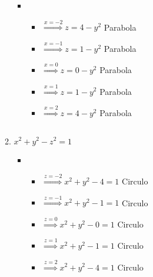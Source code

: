 \documentclass[../practica_02.tex]{subfiles}
\begin{document}
\begin{enumerate}
\begin{enumerate}
\begin{itemize}
                            $ $

                        \item
                            \begin{itemize}
                                \item $\stackrel{x=-2}{\Rightarrow} z = 4 - y^2 $ Parabola
                                \item $\stackrel{x=-1}{\Rightarrow} z = 1 - y^2 $ Parabola
                                \item $\stackrel{x=0}{\Rightarrow}  z = 0 - y^2 $ Parabola
                                \item $\stackrel{x=1}{\Rightarrow}  z = 1 - y^2 $ Parabola
                                \item $\stackrel{x=2}{\Rightarrow}  z = 4 - y^2 $ Parabola
                            \end{itemize}

                            $ $
                    \end{itemize}

                \item $x^2 + y^2 - z^2 = 1$

                    \begin{itemize}
                        \item
                            \begin{itemize}
                                \item $\stackrel{z=-2}{\Rightarrow} x^2 + y^2 - 4 = 1 $ Circulo
                                \item $\stackrel{z=-1}{\Rightarrow} x^2 + y^2 - 1 = 1 $ Circulo
                                \item $\stackrel{z=0}{\Rightarrow}  x^2 + y^2 - 0 = 1 $ Circulo
                                \item $\stackrel{z=1}{\Rightarrow}  x^2 + y^2 - 1 = 1 $ Circulo
                                \item $\stackrel{z=2}{\Rightarrow}  x^2 + y^2 - 4 = 1 $ Circulo
                            \end{itemize}

                        $ $


\end{itemize}
\end{enumerate}
\end{enumerate}
\end{document}
